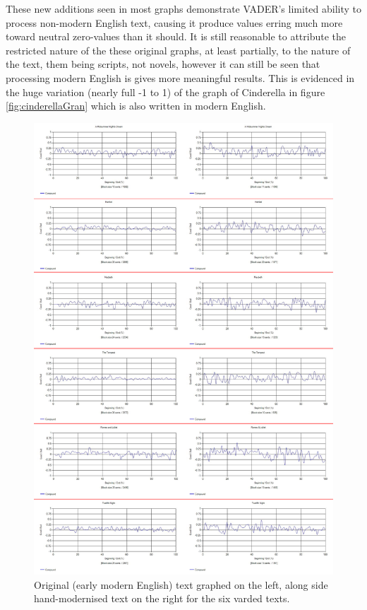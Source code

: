 \documentclass{article}
\begin{document}
        These new additions seen in most graphs demonstrate VADER's limited ability to process non-modern English text, causing it produce values erring much more toward neutral zero-values than it should. It is still reasonable to attribute the restricted nature of the these original graphs, at least partially, to the nature of the text, them being scripts, not novels, however it can still be seen that processing modern English is gives more meaningful results. This is evidenced in the huge variation (nearly full -1 to 1) of the graph of Cinderella in figure \ref{fig:cinderellaGran} which is also written in modern English.
        \begin{figure}
            \includegraphics[width=1\textwidth]{Figures/EMvsM/EMvsMAll}
            \centering
            \caption{Original (early modern English) text graphed on the left, along side hand-modernised text on the right for the six varded texts.}
            \label{fig:emvsm}
        \end{figure}
\end{document}
